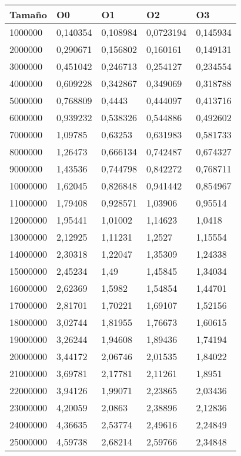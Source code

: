 \begin{tabular}{|l|l|l|l|l|}
	\hline
	Tamaño & O0 & O1 & O2 & O3 \\
	\hline
	\hline
	1000000 & 0,140354 & 0,108984 & 0,0723194 & 0,145934 \\
	\hline
	2000000 & 0,290671 & 0,156802 & 0,160161 & 0,149131 \\
	\hline
	3000000 & 0,451042 & 0,246713 & 0,254127 & 0,234554 \\
	\hline
	4000000 & 0,609228 & 0,342867 & 0,349069 & 0,318788 \\
	\hline
	5000000 & 0,768809 & 0,4443 & 0,444097 & 0,413716 \\
	\hline
	6000000 & 0,939232 & 0,538326 & 0,544886 & 0,492602 \\
	\hline
	7000000 & 1,09785 & 0,63253 & 0,631983 & 0,581733 \\
	\hline
	8000000 & 1,26473 & 0,666134 & 0,742487 & 0,674327 \\
	\hline
	9000000 & 1,43536 & 0,744798 & 0,842272 & 0,768711 \\
	\hline
	10000000 & 1,62045 & 0,826848 & 0,941442 & 0,854967 \\
	\hline
	11000000 & 1,79408 & 0,928571 & 1,03906 & 0,95514 \\
	\hline
	12000000 & 1,95441 & 1,01002 & 1,14623 & 1,0418 \\
	\hline
	13000000 & 2,12925 & 1,11231 & 1,2527 & 1,15554 \\
	\hline
	14000000 & 2,30318 & 1,22047 & 1,35309 & 1,24338 \\
	\hline
	15000000 & 2,45234 & 1,49 & 1,45845 & 1,34034 \\
	\hline
	16000000 & 2,62369 & 1,5982 & 1,54854 & 1,44701 \\
	\hline
	17000000 & 2,81701 & 1,70221 & 1,69107 & 1,52156 \\
	\hline
	18000000 & 3,02744 & 1,81955 & 1,76673 & 1,60615 \\
	\hline
	19000000 & 3,26244 & 1,94608 & 1,89436 & 1,74194 \\
	\hline
	20000000 & 3,44172 & 2,06746 & 2,01535 & 1,84022 \\
	\hline
	21000000 & 3,69781 & 2,17781 & 2,11261 & 1,8951 \\
	\hline
	22000000 & 3,94126 & 1,99071 & 2,23865 & 2,03436 \\
	\hline
	23000000 & 4,20059 & 2,0863 & 2,38896 & 2,12836 \\
	\hline
	24000000 & 4,36635 & 2,53774 & 2,49616 & 2,24849 \\
	\hline
	25000000 & 4,59738 & 2,68214 & 2,59766 & 2,34848 \\
	\hline
\end{tabular}
